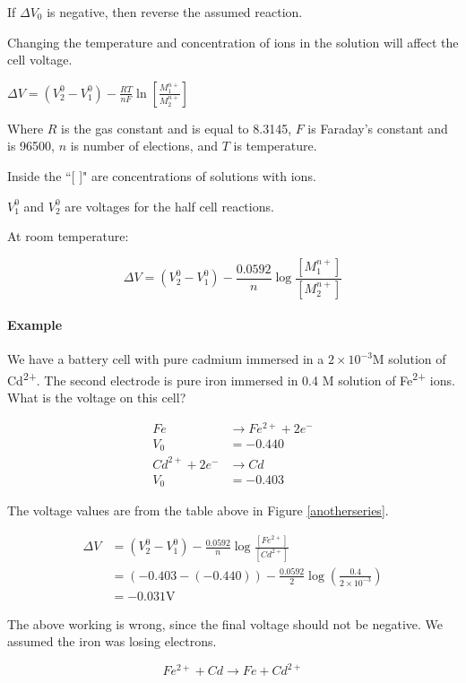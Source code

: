 \documentclass{article}
\begin{document}
If $\Delta V_0$ is negative, then reverse the assumed reaction.

Changing the temperature and concentration of ions in the solution will affect the cell voltage.

$\Delta V = (V_2^0 - V_1^0) - \frac{RT}{nF}\ln\left[\frac{M_1^{n+}}{M_2^{n+}}\right]$

Where $R$ is the gas constant and is equal to 8.3145, $F$ is Faraday's constant and is 96500, $n$ is number of elections, and $T$ is temperature.

Inside the ``[ ]" are concentrations of solutions with ions.

$V_1^0$ and $V_2^0$ are voltages for the half cell reactions.

At room temperature:

\[\Delta V = (V_2^0 - V_1^0) - \frac{0.0592}{n}\log\frac{[M_1^{n+}]}{[M_2^{n+}]}\]

\paragraph{Example} We have a battery cell with pure cadmium immersed in a $2\times10^{-3}$M solution of Cd\textsuperscript{2+}. The second electrode is pure iron immersed in 0.4 M solution of Fe\textsuperscript{2+} ions. What is the voltage on this cell?

\begin{align*}
    Fe &\rightarrow Fe^{2+} + 2e^-\\
    V_0 &= -0.440\\
    Cd^{2+} + 2e^- &\rightarrow Cd\\
    V_0 &= -0.403
\end{align*}

The voltage values are from the table above in Figure \ref{anotherseries}.

\begin{align*}
    \Delta V &= (V_2^0 - V_1^0) - \frac{0.0592}{n}\log\frac{[Fe^{2+}]}{[Cd^{2+}]}\\
    &= (-0.403 - (-0.440)) - \frac{0.0592}{2}\log\left(\frac{0.4}{2\times10^{-3}}\right)\\
    &= -0.031\si\volt
\end{align*}

The above working is wrong, since the final voltage should not be negative. We assumed the iron was losing electrons.

\begin{equation*}
    Fe^{2+} + Cd \rightarrow Fe + Cd^{2+}
\end{equation*}
\end{document}
